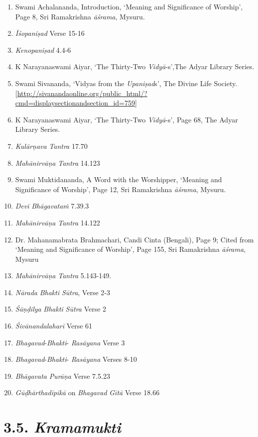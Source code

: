 \begin{enumerate}
\itemsep=0pt
\item
Swami Achalananda, Introduction, `Meaning and Significance of Worship', Page 8, Sri Ramakrishna \emph{āśrama}, Mysuru.
\item
\emph{Īśopaniṣad} Verse 15-16
\item
\emph{Kenopaniṣad} 4.4-6
\item
K Narayanaswami Aiyar, `The Thirty-Two \emph{Vidyā}-s',The Adyar Library Series.
\item
Swami Sivananda, `Vidyas from the \emph{Upaniṣad}s', The Divine Life Society. {[}\url{http://sivanandaonline.org/public_html/?cmd=displaysectionandsection_id=759}{]}
\item
K Narayanaswami Aiyar, `The Thirty-Two \emph{Vidyā}-s', Page 68, The Adyar Library Series.
\item
\emph{Kulārṇava} \emph{Tantra} 17.70
\item
\emph{Mahānirvāṇa} \emph{Tantra} 14.123
\item
Swami Muktidananda, A Word with the Worshipper, `Meaning and Significance of Worship', Page 12, Sri Ramakrishna \emph{āśrama}, Mysuru.
\item
\emph{Devī} \emph{Bhāgavataṁ} 7.39.3
\item
\emph{Mahānirvāṇa} \emph{Tantra} 14.122
\item
Dr. Mahanamabrata Brahmachari, Candi Cinta (Bengali), Page 9; Cited from `Meaning and Significance of Worship', Page 155, Sri Ramakrishna \emph{āśrama}, Mysuru
\item
\emph{Mahānirvāṇa} \emph{Tantra} 5.143-149.
\item
\emph{Nārada} \emph{Bhakti} \emph{Sūtra}, Verse 2-3
\item
\emph{Śāṇḍilya} \emph{Bhakti} \emph{Sūtra} Verse 2
\item
\emph{Śivānandalaharī} Verse 61
\item
\emph{Bhagavad}-\emph{Bhakti}- \emph{Rasāyana} Verse 3
\item
\emph{Bhagavad}-\emph{Bhakti}- \emph{Rasāyana} Verses 8-10
\item
\emph{Bhāgavata} \emph{Purāṇa} Verse 7.5.23
\item
\emph{Gūḍhārthadīpikā} on \emph{Bhagavad} \emph{Gītā} Verse 18.66
\end{enumerate}

\section*{3.5. \emph{Kramamukti}}

